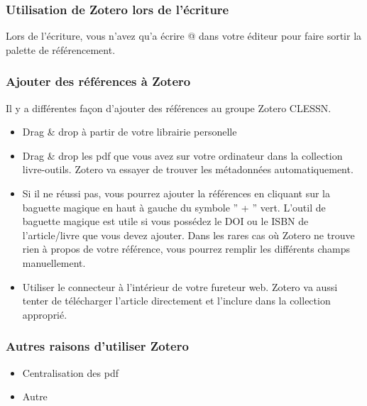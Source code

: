 \documentclass[
  letterpaper,
]{scrbook}
\providecommand{\tightlist}{%
  \setlength{\itemsep}{0pt}\setlength{\parskip}{0pt}}\usepackage{longtable,booktabs,array}
\begin{document}
\hypertarget{utilisation-de-zotero-lors-de-luxe9criture}{%
\subsubsection{Utilisation de Zotero lors de
l'écriture}\label{utilisation-de-zotero-lors-de-luxe9criture}}

Lors de l'écriture, vous n'avez qu'a écrire @ dans votre éditeur pour
faire sortir la palette de référencement.

\hypertarget{ajouter-des-ruxe9fuxe9rences-uxe0-zotero}{%
\subsubsection{Ajouter des références à
Zotero}\label{ajouter-des-ruxe9fuxe9rences-uxe0-zotero}}

Il y a différentes façon d'ajouter des références au groupe Zotero
CLESSN.

\begin{itemize}
\tightlist
\item
  Drag \& drop à partir de votre librairie personelle
\item
  Drag \& drop les pdf que vous avez sur votre ordinateur dans la
  collection livre-outils. Zotero va essayer de trouver les métadonnées
  automatiquement.
\item
  Si il ne réussi pas, vous pourrez ajouter la références en cliquant
  sur la baguette magique en haut à gauche du symbole '' + '' vert.
  L'outil de baguette magique est utile si vous possédez le DOI ou le
  ISBN de l'article/livre que vous devez ajouter. Dans les rares cas où
  Zotero ne trouve rien à propos de votre référence, vous pourrez
  remplir les différents champs manuellement.
\item
  Utiliser le connecteur à l'intérieur de votre fureteur web. Zotero va
  aussi tenter de télécharger l'article directement et l'inclure dans la
  collection approprié.
\end{itemize}

\hypertarget{autres-raisons-dutiliser-zotero}{%
\subsubsection{Autres raisons d'utiliser
Zotero}\label{autres-raisons-dutiliser-zotero}}

\begin{itemize}
\tightlist
\item
  Centralisation des pdf
\item
  Autre
\end{itemize}
\end{document}
